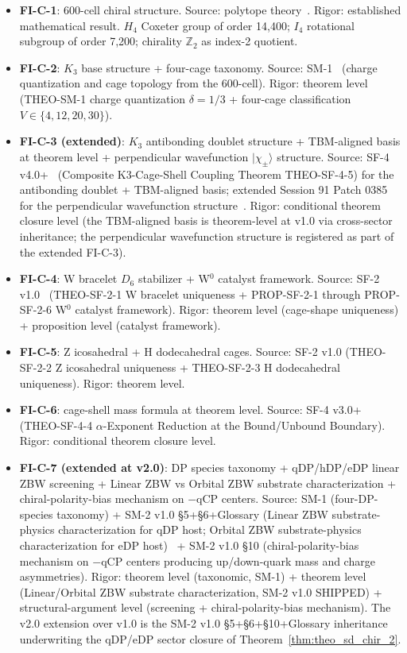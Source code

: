 \documentclass[11pt,letterpaper]{article}
\newcommand{\Kthree}{\ensuremath{K_3}}
\newcommand{\Dsix}{D_6}
\newcommand{\Hfour}{H_4}
\newcommand{\Ifour}{I_4}
\begin{document}
\begin{itemize}\setlength\itemsep{0.2em}
    \item \textbf{FI-C-1}: 600-cell chiral structure. Source: polytope theory~\cite{coxeter_1973}. Rigor: established mathematical result. $\Hfour$ Coxeter group of order 14{,}400; $\Ifour$ rotational subgroup of order 7{,}200; chirality $\mathbb{Z}_2$ as index-2 quotient.
    \item \textbf{FI-C-2}: $\Kthree$ base structure + four-cage taxonomy. Source: SM-1~\cite{abshier_sm1} (charge quantization and cage topology from the 600-cell). Rigor: theorem level (THEO-SM-1 charge quantization $\delta = 1/3$ + four-cage classification $V \in \{4, 12, 20, 30\}$).
    \item \textbf{FI-C-3 (extended)}: $\Kthree$ antibonding doublet structure + TBM-aligned basis at theorem level + perpendicular wavefunction $|\chi_\pm\rangle$ structure. Source: SF-4 v4.0+~\cite{abshier_sf4} (Composite K3-Cage-Shell Coupling Theorem THEO-SF-4-5) for the antibonding doublet + TBM-aligned basis; extended Session 91 Patch 0385 for the perpendicular wavefunction structure~\cite{abshier_capotauro_subclaim_c_sketch}. Rigor: conditional theorem closure level (the TBM-aligned basis is theorem-level at v1.0 via cross-sector inheritance; the perpendicular wavefunction structure is registered as part of the extended FI-C-3).
    \item \textbf{FI-C-4}: W bracelet $\Dsix$ stabilizer + W$^0$ catalyst framework. Source: SF-2 v1.0~\cite{abshier_sf2} (THEO-SF-2-1 W bracelet uniqueness + PROP-SF-2-1 through PROP-SF-2-6 W$^0$ catalyst framework). Rigor: theorem level (cage-shape uniqueness) + proposition level (catalyst framework).
    \item \textbf{FI-C-5}: Z icosahedral + H dodecahedral cages. Source: SF-2 v1.0 (THEO-SF-2-2 Z icosahedral uniqueness + THEO-SF-2-3 H dodecahedral uniqueness). Rigor: theorem level.
    \item \textbf{FI-C-6}: cage-shell mass formula at theorem level. Source: SF-4 v3.0+~\cite{abshier_sf4} (THEO-SF-4-4 $\alpha$-Exponent Reduction at the Bound/Unbound Boundary). Rigor: conditional theorem closure level.
    \item \textbf{FI-C-7 (extended at v2.0)}: DP species taxonomy + qDP/hDP/eDP linear ZBW screening + Linear ZBW vs Orbital ZBW substrate characterization + chiral-polarity-bias mechanism on $-$qCP centers. Source: SM-1 (four-DP-species taxonomy) + SM-2 v1.0 \S5+\S6+Glossary (Linear ZBW substrate-physics characterization for qDP host; Orbital ZBW substrate-physics characterization for eDP host)~\cite{abshier_sm2} + SM-2 v1.0 \S10 (chiral-polarity-bias mechanism on $-$qCP centers producing up/down-quark mass and charge asymmetries). Rigor: theorem level (taxonomic, SM-1) + theorem level (Linear/Orbital ZBW substrate characterization, SM-2 v1.0 SHIPPED) + structural-argument level (screening + chiral-polarity-bias mechanism). The v2.0 extension over v1.0 is the SM-2 v1.0 \S5+\S6+\S10+Glossary inheritance underwriting the qDP/eDP sector closure of Theorem~\ref{thm:theo_sd_chir_2}.

\end{itemize}
\end{document}
